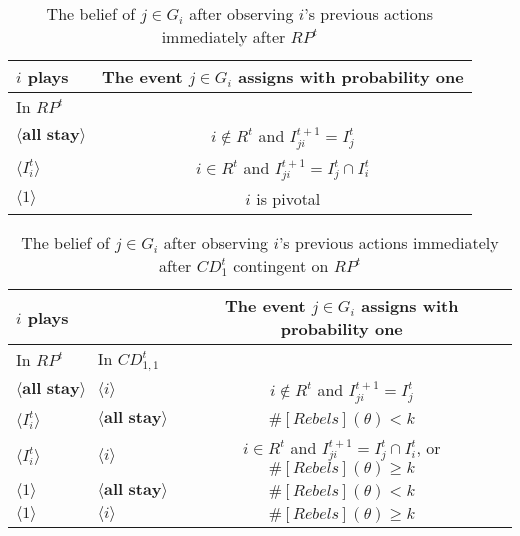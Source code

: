 \documentclass[12pt,letter]{article}
\theoremstyle{definition}
\theoremstyle{remark}
\theoremstyle{claim}
\begin{document}
\begin{table}[!htbp]
\caption{The belief of $j\in G_i$ after observing $i$'s previous actions immediately after $RP^t$ }
\label{Table_blf_up_rpt}
\begin{center}
\begin{tabular}{l | c}
 $i$ plays  		&	 The event $j\in G_i$ assigns with probability one \\
\hline
\hline
 In $RP^t$		&					 \\
\hline
$\langle \textbf{all stay} \rangle$  &     $i\notin R^t$ and $I^{t+1}_{ji}=I^t_j$ \\
$\langle I^t_{i} \rangle$  &     $i\in R^t$ and $I^{t+1}_{ji}=I^t_j\cap I^t_{i}$ \\
$\langle 1 \rangle$  & 	  $i$ is pivotal    \\
  \hline
\end{tabular}
\end{center}
\end{table}



\begin{table}[!htbp]
\caption{The belief of $j\in G_i$ after observing $i$'s previous actions immediately after $CD^t_1$ {contingent} on $RP^t$ }
\label{Table_blf_up_cdt1}
\begin{center}
\begin{tabular}{l  l | c}
 $i$ plays	&			  & The event $j\in G_i$ assigns with probability one \\
\hline
\hline
	  In $RP^t$	 	&		In $CD^t_{1,1}$	&				  \\
\hline
$\langle \textbf{all stay} \rangle$  & $\langle i \rangle$	&    $i\notin R^t$ and $I^{t+1}_{ji}=I^t_j$  \\
$\langle I^t_{i} \rangle$  & $\langle \textbf{all stay} \rangle$	&    $\#[Rebels](\theta)< k$ \\
$\langle I^t_{i} \rangle$  & $\langle i \rangle$	&    $i\in R^t$ and $I^{t+1}_{ji}=I^t_j\cap I^t_{i}$,  or $\#[Rebels](\theta)\geq k$ \\
$\langle 1 \rangle$  & $\langle \textbf{all stay} \rangle$	&	  $\#[Rebels](\theta)< k$    \\
$\langle 1 \rangle$  & $\langle i \rangle$	&	  $\#[Rebels](\theta)\geq k$  \\
  \hline
\end{tabular}
\end{center}
\end{table}
\end{document}
